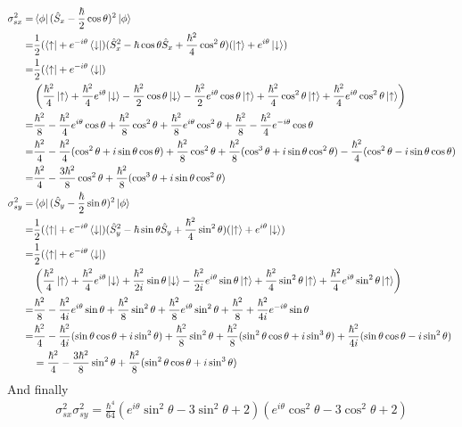 \documentclass{article}
\begin{document}
\begin{align*}
\sigma_{sx}^2 
=& \bra{\phi}(\hat{S}_x-\frac{\hbar}{2}\cos{\theta})^2\ket{\phi} \\
=& \frac{1}{2}(\bra{\uparrow}+e^{-i\theta}\bra{\downarrow})(\hat{S}^2_x-\hbar\cos{\theta}\hat{S}_x+\frac{\hbar^2}{4}\cos^2\theta )(\ket{\uparrow}+e^{i\theta}\ket{\downarrow}) \\
=& \frac{1}{2}(\bra{\uparrow}+e^{-i\theta}\bra{\downarrow}) \\
&\left(
\frac{\hbar^2}{4}\ket{\uparrow}
+\frac{\hbar^2}{4}e^{i\theta}\ket{\downarrow}
-\frac{\hbar^2}{2}\cos{\theta}\ket{\downarrow}
-\frac{\hbar^2}{2} e^{i\theta}\cos{\theta}\ket{\uparrow}
+\frac{\hbar^2}{4}\cos^2{\theta}\ket{\uparrow}
+\frac{\hbar^2}{4}e^{i\theta}\cos^2{\theta}\ket{\uparrow} 
\right) \\
=&\frac{\hbar^2}{8}-\frac{\hbar^2}{4}e^{i\theta}\cos{\theta}+\frac{\hbar^2}{8}\cos^2{\theta}+\frac{\hbar^2}{8}e^{i\theta}\cos^2{\theta}+\frac{\hbar^2}{8}-\frac{\hbar^2}{4}e^{-i\theta}\cos{\theta} \\
=& \frac{\hbar^2}{4}-\frac{\hbar^2}{4}(\cos^2\theta+i\sin\theta\cos\theta) +\frac{\hbar^2}{8}\cos^2\theta+\frac{\hbar^2}{8}(\cos^3\theta+i\sin\theta\cos^2\theta)-\frac{\hbar^2}{4}(\cos^2\theta-i\sin\theta\cos\theta) \\
=& \frac{\hbar^2}{4}-\frac{3\hbar^2}{8}\cos^2\theta+\frac{\hbar^2}{8}(\cos^3\theta+i\sin\theta\cos^2\theta) \\
\sigma_{sy}^2
=& \bra{\phi}(\hat{S}_y-\frac{\hbar}{2}\sin{\theta})^2\ket{\phi} \\
=& \frac{1}{2}(\bra{\uparrow}+e^{-i\theta}\bra{\downarrow})(\hat{S}^2_y-\hbar\sin{\theta}\hat{S}_y+\frac{\hbar^2}{4}\sin^2\theta )(\ket{\uparrow}+e^{i\theta}\ket{\downarrow}) \\
=&\frac{1}{2}(\bra{\uparrow}+e^{-i\theta}\bra{\downarrow}) \\
&\left(
\frac{\hbar^2}{4}\ket{\uparrow}
+\frac{\hbar^2}{4}e^{i\theta}\ket{\downarrow}
+\frac{\hbar^2}{2i}\sin{\theta}\ket{\downarrow}
-\frac{\hbar^2}{2i} e^{i\theta}\sin{\theta}\ket{\uparrow}
+\frac{\hbar^2}{4}\sin^2{\theta}\ket{\uparrow}
+\frac{\hbar^2}{4}e^{i\theta}\sin^2{\theta}\ket{\uparrow} 
\right) \\
=&\frac{\hbar^2}{8}-\frac{\hbar^2}{4i}e^{i\theta}\sin{\theta}+\frac{\hbar^2}{8}\sin^2{\theta}+\frac{\hbar^2}{8}e^{i\theta}\sin^2{\theta}+\frac{\hbar^2}{8}+\frac{\hbar^2}{4i}e^{-i\theta}\sin{\theta} \\
=& \frac{\hbar^2}{4}-\frac{\hbar^2}{4i}(\sin\theta\cos\theta+i\sin^2\theta)+\frac{\hbar^2}{8}\sin^2\theta+\frac{\hbar^2}{8}(\sin^2\theta\cos\theta+i\sin^3\theta) +\frac{\hbar^2}{4i}(\sin\theta\cos\theta-i\sin^2\theta) \\
&=\frac{\hbar^2}{4}-\frac{3\hbar^2}{8}\sin^2\theta+\frac{\hbar^2}{8}(\sin^2\theta\cos\theta+i\sin^3\theta)
\end{align*}
And finally
\begin{align*}
\sigma_{sx}^2 \sigma_{sy}^2 
= \frac{\hbar^4}{64}(e^{i\theta}\sin^2\theta-3\sin^2\theta+2)(e^{i\theta}\cos^2\theta-3\cos^2\theta+2)
\end{align*}
\end{document}
